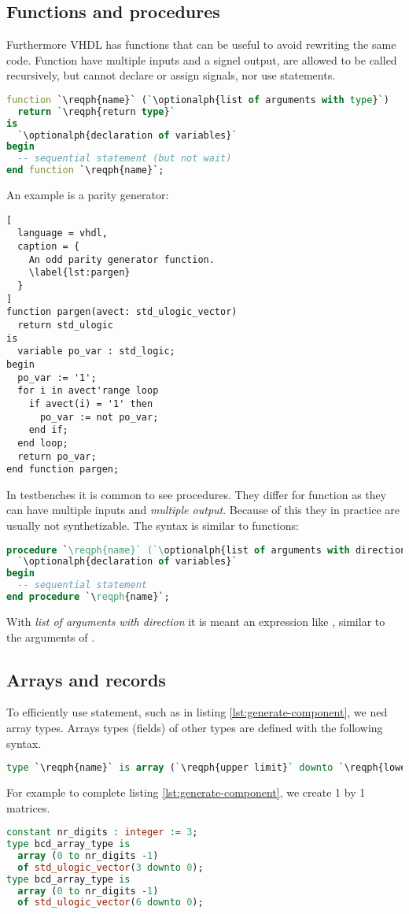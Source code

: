 \documentclass[margin=small]{tex/hsrzf}
\begin{document}
\subsection{Functions and procedures}
Furthermore VHDL has functions that can be useful to avoid rewriting the same code. Function have multiple inputs and a signel output, are allowed to be called recursively, but cannot declare or assign signals, nor use  statements.
\begin{lstlisting}[language=vhdl]
function `\reqph{name}` (`\optionalph{list of arguments with type}`)
  return `\reqph{return type}`
is
  `\optionalph{declaration of variables}`
begin
  -- sequential statement (but not wait)
end function `\reqph{name}`;
\end{lstlisting}
An example is a parity generator:
\begin{lstlisting}[
  language = vhdl,
  caption = {
    An odd parity generator function.
    \label{lst:pargen}
  }
]
function pargen(avect: std_ulogic_vector)
  return std_ulogic
is
  variable po_var : std_logic;
begin
  po_var := '1';
  for i in avect'range loop
    if avect(i) = '1' then
      po_var := not po_var;
    end if;
  end loop;
  return po_var;
end function pargen;
\end{lstlisting}

In testbenches it is common to see procedures. They differ for function as they can have multiple inputs and \emph{multiple output}. Because of this they in practice are usually not synthetizable. The syntax is similar to functions:
\begin{lstlisting}[language=vhdl]
procedure `\reqph{name}` (`\optionalph{list of arguments with direction}`) is
  `\optionalph{declaration of variables}`
begin
  -- sequential statement
end procedure `\reqph{name}`;
\end{lstlisting}
With \emph{list of arguments with direction} it is meant an expression like , similar to the arguments of .

\subsection{Arrays and records}

To efficiently use  statement, such as in listing \ref{lst:generate-component}, we ned array types. Arrays types (fields) of other types are defined with the following syntax.
\begin{lstlisting}[language=vhdl]
type `\reqph{name}` is array (`\reqph{upper limit}` downto `\reqph{lower limit}`) of `\reqph{base type}`;
\end{lstlisting}
For example to complete listing \ref{lst:generate-component}, we create 1 by 1 matrices.
\begin{lstlisting}[language = vhdl]
constant nr_digits : integer := 3;
type bcd_array_type is
  array (0 to nr_digits -1)
  of std_ulogic_vector(3 downto 0);
type bcd_array_type is
  array (0 to nr_digits -1)
  of std_ulogic_vector(6 downto 0);
\end{lstlisting}
\end{document}
